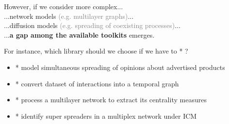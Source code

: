 \documentclass{beamer}
\newcommand{\arrowdown}{\tikz [baseline=-1ex]{\node [myarrow,rotate=-90] {};}}
\begin{document}
\begin{frame}{\secname}
    However, if we consider more complex...\\
    \vspace{1em}
    \hspace{3em}...network models \textcolor{gray}{(e.g. multilayer graphs)}... \\
    \vspace{1em}
    \hspace{3em}...diffusion models \textcolor{gray}{(e.g. spreading of coexisting processes)}... \\
    \vspace{1em}
    \hspace{10em}...\textbf{a gap among the available toolkits} emerges.
\end{frame}

\begin{frame}{\secname}
    \begin{center}
        For instance, which library should we choose if we have to * ?
    \end{center}
    \vspace{3em}
    \begin{itemize}
        \setlength{\itemindent}{-2em}
        \item[] * model simultaneous spreading of opinions about advertised products
        \item[] * convert dataset of interactions into a temporal graph
        \item[] * process a multilayer network to extract its centrality measures
        \item[] * identify super spreaders in a multiplex network under ICM
    \end{itemize}
\end{frame}

\end{document}
